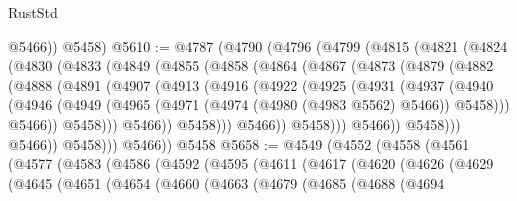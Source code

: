 \begin{lexlean}{RustStd}
\begin{coremodule}
          @5466))
      @5458)
@5610 := @4787
    (@4790
      (@4796
        (@4799
          (@4815
            (@4821
              (@4824
                (@4830
                  (@4833
                    (@4849
                      (@4855
                        (@4858
                          (@4864
                            (@4867
                              (@4873
                                (@4879
                                  (@4882
                                    (@4888
                                      (@4891
                                        (@4907
                                          (@4913
                                            (@4916
                                              (@4922
                                                (@4925
                                                  (@4931
                                                    (@4937
                                                      (@4940
                                                        (@4946
                                                          (@4949
                                                            (@4965
                                                              (@4971
                                                                (@4974 (@4980 (@4983 @5562) @5466))
                                                                @5458)))
                                                          @5466))
                                                      @5458)))
                                                @5466))
                                            @5458)))
                                      @5466))
                                  @5458)))
                            @5466))
                        @5458)))
                  @5466))
              @5458)))
        @5466))
    @5458
@5658 := @4549
    (@4552
      (@4558
        (@4561
          (@4577
            (@4583
              (@4586
                (@4592
                  (@4595
                    (@4611
                      (@4617
                        (@4620
                          (@4626
                            (@4629
                              (@4645
                                (@4651
                                  (@4654
                                    (@4660
                                      (@4663
                                        (@4679
                                          (@4685
                                            (@4688
                                              (@4694

\end{coremodule}
\end{lexlean}
